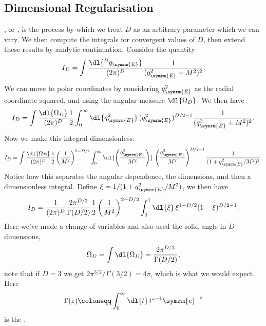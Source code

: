 \documentclass[fleqn]{NotesClass}
\newcommand{\e}{\symrm{e}}
\begin{document}
    \subsection{Dimensional Regularisation}
    , or , is the process by which we treat \(D\) as an arbitrary parameter which we can vary.
    We then compute the integrals for convergent values of \(D\), then extend these results by analytic continuation.
    Consider the quantity
    \begin{equation}
        I_D = \int \frac{\dl{^D q_{\symrm{E}}}}{(2\pi)^D} \frac{1}{(q_{\symrm{E}}^2 + M^2)^2}.
    \end{equation}
    We can move to polar coordinates by considering \(q_{\symrm{E}}^2\) as the radial coordinate squared, and using the angular measure \(\dl{\Omega_D}\).
    We then have
    \begin{equation}
        I_D = \int \frac{\dl{\Omega_D}}{(2\pi)^D} \frac{1}{2} \int_{0}^{\infty} \dl{q_{\symrm{E}}^2} \, (q_{\symrm{E}}^2)^{D/2 - 1} \frac{1}{(q_{\symrm{E}}^2 + M^2)^2}.
    \end{equation}
    Now we make this integral dimensionless:
    \begin{equation}
        I_D = \int \frac{\dl{\Omega_D}}{(2\pi)^D} \frac{1}{2} \left( \frac{1}{M^2} \right)^{2 - D/2} \int_0^{\infty} \dl{\left( \frac{q_{\symrm{E}}^2}{M^2} \right)} \, \left( \frac{q_{\symrm{E}}^2}{M^2} \right)^{D/2 - 1} \frac{1}{(1 + q_{\symrm{E}}^2/M^2)^2}.
    \end{equation}
    Notice how this separates the angular dependence, the dimensions, and then a dimensionless integral.
    Define \(\xi = 1/(1 + q_{\symrm{E}}^2/M^2)\), we then have
    \begin{equation}
        I_D = \frac{1}{(2\pi)^D} \frac{2\pi^{D/2}}{\Gamma(D/2)} \frac{1}{2} \left( \frac{1}{M^2} \right)^{2 - D/2} \int_0^1 \dl{\xi} \, \xi^{1 - D/2}(1 - \xi)^{D/2 - 1}.
    \end{equation}
    Here we've made a change of variables and also used the solid angle in \(D\) dimensions,
    \begin{equation}
        \Omega_D = \int \dl{\Omega_D} = \frac{2\pi^{D/2}}{\Gamma(D/2)},
    \end{equation}
    note that if \(D = 3\) we get \(2\pi^{3/2}/\Gamma(3/2) = 4\pi\), which is what we would expect.
    Here
    \begin{equation}
        \Gamma(z) \coloneqq \int_0^{\infty} \dl{t} \, t^{z - 1} \e^{-t}
    \end{equation}
    is the .
    
\end{document}
